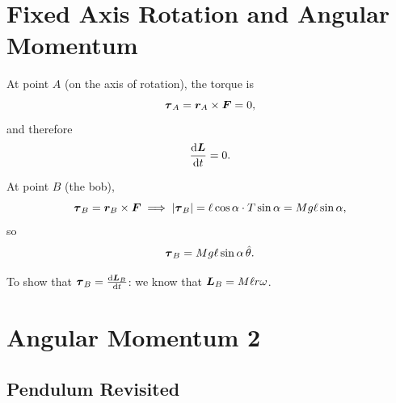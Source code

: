 
\chapter{Fixed Axis Rotation and Angular Momentum}


At point $A$ (on the axis of rotation), the torque is
\[
    \vect{\tau}_A = \lvect{r}_A \times \vect{F} = 0,
\]
and therefore
\[
    \dv{\vect{L}}{t} = 0.
\]

At point $B$ (the bob),
\[
    \vect{\tau}_B = \lvect{r}_B \times \vect{F}
    \implies
    |\vect{\tau}_B| = \ell\cos\alpha \cdot T\sin\alpha = Mg\ell\sin\alpha,
\]
so
\[
    \vect{\tau}_B = Mg\ell\sin\alpha\,\hat{\theta}.
\]

To show that $\vect{\tau}_B = \dv{\vect{L}_B}{t}$: we know that $\vect{L}_B = M\ell r\omega$.




\chapter{Angular Momentum 2}

\section{Pendulum Revisited}

